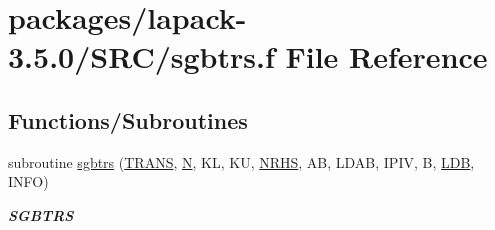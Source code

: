 \hypertarget{sgbtrs_8f}{}\section{packages/lapack-\/3.5.0/\+S\+R\+C/sgbtrs.f File Reference}
\label{sgbtrs_8f}
\subsection*{Functions/\+Subroutines}
\begin{DoxyCompactItemize}
\item 
subroutine \hyperlink{group__realGBcomputational_ga1ca828b2948fbb78c91ed3e2961bcbd2}{sgbtrs} (\hyperlink{superlu__enum__consts_8h_a0c4e17b2d5cea33f9991ccc6a6678d62a1f61e3015bfe0f0c2c3fda4c5a0cdf58}{T\+R\+A\+N\+S}, \hyperlink{polmisc_8c_a0240ac851181b84ac374872dc5434ee4}{N}, K\+L, K\+U, \hyperlink{example__user_8c_aa0138da002ce2a90360df2f521eb3198}{N\+R\+H\+S}, A\+B, L\+D\+A\+B, I\+P\+I\+V, B, \hyperlink{example__user_8c_a50e90a7104df172b5a89a06c47fcca04}{L\+D\+B}, I\+N\+F\+O)
\begin{DoxyCompactList}\small\item\em {\bfseries S\+G\+B\+T\+R\+S} \end{DoxyCompactList}\end{DoxyCompactItemize}

